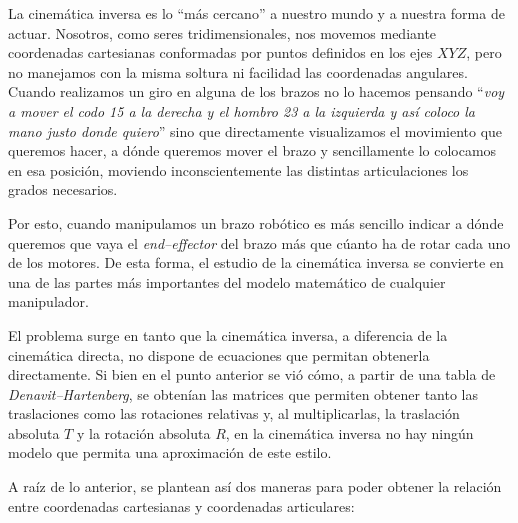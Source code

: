 La cinemática inversa es lo ``más cercano'' a nuestro mundo y a nuestra forma de actuar.
Nosotros, como seres tridimensionales, nos movemos mediante coordenadas cartesianas
conformadas por puntos definidos en los ejes $XYZ$, pero no manejamos con la misma
soltura ni facilidad las coordenadas angulares. Cuando realizamos un giro en alguna
de los brazos no lo hacemos pensando ``\textit{voy a mover el codo
    15\textdegree{} a la derecha y el hombro 23\textdegree{} a la izquierda y así coloco la
    mano justo donde quiero}'' sino que directamente visualizamos el movimiento que queremos
hacer, a dónde queremos mover el brazo y sencillamente lo colocamos en esa posición,
moviendo inconscientemente las distintas articulaciones los grados necesarios.

Por esto, cuando manipulamos un brazo robótico es más sencillo indicar a dónde queremos
que vaya el \textit{end--effector} del brazo más que cúanto ha de rotar cada uno de los
motores. De esta forma, el estudio de la cinemática inversa se convierte en una de las
partes más importantes del modelo matemático de cualquier manipulador.

El problema surge en tanto que la cinemática inversa, a diferencia de la cinemática
directa, no dispone de ecuaciones que permitan obtenerla directamente. Si bien en el
punto anterior se vió cómo, a partir de una tabla de \textit{Denavit--Hartenberg},
se obtenían las matrices que permiten obtener tanto las traslaciones como las rotaciones
relativas y, al multiplicarlas, la traslación absoluta $T$ y la rotación absoluta $R$,
en la cinemática inversa no hay ningún modelo que permita una aproximación de este estilo.

A raíz de lo anterior, se plantean así dos maneras para poder obtener la relación entre
coordenadas cartesianas y coordenadas articulares:

